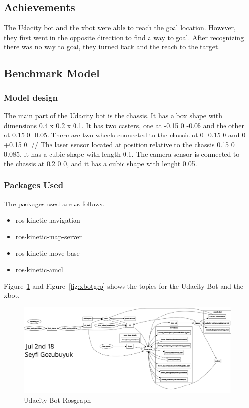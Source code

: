 \documentclass[10pt,journal,compsoc]{IEEEtran}
\begin{document}
\subsection{Achievements}
The Udacity bot and the xbot were able to reach the goal location. However, they first went in the opposite direction to find a way to goal. After recognizing there was no way to goal, they turned back and the reach to the target.

\subsection{Benchmark Model}
\subsubsection{Model design}
The main part of the Udacity bot is the chassis. It has a box shape with dimensions 0.4 x 0.2 x 0.1. It has two casters, one at -0.15 0 -0.05 and the other at 0.15 0 -0.05. There are two wheels connected to the chassis at 0 -0.15 0 and 0 +0.15 0. //
The laser sensor located at position relative to the chassis 0.15 0 0.085. It has a cubic shape with length 0.1. The camera sensor is connected to the chassis at 0.2 0 0, and it has a cubic shape with lenght 0.05.

\subsubsection{Packages Used}
The packages used are as follows:
\begin{itemize}
\item ros-kinetic-navigation
\item ros-kinetic-map-server
\item ros-kinetic-move-base
\item ros-kinetic-amcl
\end{itemize}

Figure~\ref{fig:ubotgrp} and Figure~\ref{fig:xbotgrp} shows the topics for the Udacity Bot and the xbot.


\begin{figure}[thpb]
      \centering
      \includegraphics[width=\linewidth]{figures/rosgraph_ubot.png}
      \caption{Udacity Bot Rosgraph}
      \label{fig:ubotgrp}
\end{figure}
\end{document}
